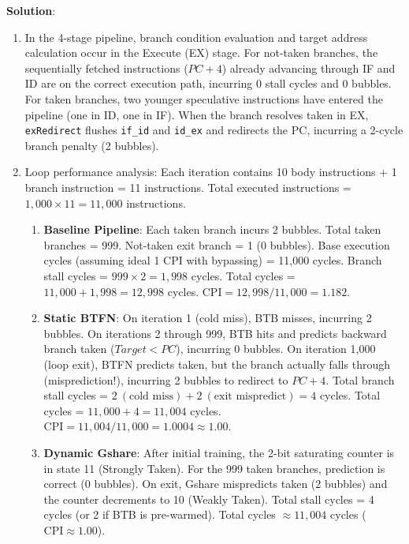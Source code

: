 \begin{problem}
\textbf{Solution}:
\begin{enumerate}
    \item In the 4-stage pipeline, branch condition evaluation and target address calculation occur in the Execute (EX) stage. For not-taken branches, the sequentially fetched instructions ($PC+4$) already advancing through IF and ID are on the correct execution path, incurring 0 stall cycles and 0 bubbles. For taken branches, two younger speculative instructions have entered the pipeline (one in ID, one in IF). When the branch resolves taken in EX, \texttt{exRedirect} flushes \texttt{if\_id} and \texttt{id\_ex} and redirects the PC, incurring a 2-cycle branch penalty (2 bubbles).
    \item Loop performance analysis:
    Each iteration contains 10 body instructions + 1 branch instruction = 11 instructions. Total executed instructions = $1,000 \times 11 = 11,000$ instructions.
    \begin{enumerate}
        \item \textbf{Baseline Pipeline}:
        Each taken branch incurs 2 bubbles. Total taken branches = 999. Not-taken exit branch = 1 (0 bubbles).
        Base execution cycles (assuming ideal 1 CPI with bypassing) = 11,000 cycles.
        Branch stall cycles = $999 \times 2 = 1,998$ cycles.
        Total cycles = $11,000 + 1,998 = 12,998$ cycles.
        $\text{CPI} = 12,998 / 11,000 = \mathbf{1.182}$.
        \item \textbf{Static BTFN}:
        On iteration 1 (cold miss), BTB misses, incurring 2 bubbles. On iterations 2 through 999, BTB hits and predicts backward branch taken ($Target < PC$), incurring 0 bubbles. On iteration 1,000 (loop exit), BTFN predicts taken, but the branch actually falls through (misprediction!), incurring 2 bubbles to redirect to $PC+4$.
        Total branch stall cycles = $2 \ (\text{cold miss}) + 2 \ (\text{exit mispredict}) = 4$ cycles.
        Total cycles = $11,000 + 4 = 11,004$ cycles.
        $\text{CPI} = 11,004 / 11,000 = \mathbf{1.0004} \approx \mathbf{1.00}$.
        \item \textbf{Dynamic Gshare}:
        After initial training, the 2-bit saturating counter is in state 11 (Strongly Taken). For the 999 taken branches, prediction is correct (0 bubbles). On exit, Gshare mispredicts taken (2 bubbles) and the counter decrements to 10 (Weakly Taken). Total stall cycles = 4 cycles (or 2 if BTB is pre-warmed). Total cycles $\approx 11,004$ cycles ($\text{CPI} \approx \mathbf{1.00}$).
    \end{enumerate}

\end{enumerate}
\end{problem}
